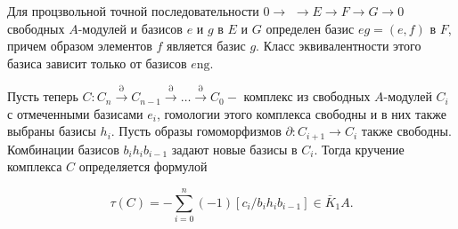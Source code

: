 \documentclass[10pt]{article}
\begin{document}
Для процзвольной точной последовательности $0 \rightarrow$ $\rightarrow E \rightarrow F \rightarrow G \rightarrow 0$ свободных $A$-модулей и базисов $e$ и $g$ в $E$ и $G$ определен базис $e g=(e, f)$ в $F$, причем образом элементов $f$ является базис $g$. Класс эквивалентности этого базиса зависит только от базисов $e \mathrm{ng}$.



Пусть теперь $C: C_{n} \stackrel{\partial}{\rightarrow} C_{n-1} \stackrel{\partial}{\rightarrow} \ldots \stackrel{\partial}{\rightarrow} C_{0}-$ комплекс из свободных $A$-модулей $C_{i}$ с отмеченными базисами $e_{i}$, гомологии этого комплекса свободны и в них также выбраны базисы $h_{i}$. Пусть образы гомоморфизмов $\partial: C_{i+1} \rightarrow C_{i}$ также свободны. Комбинации базисов $b_{i} h_{i} b_{i-1}$ задают новые базисы в $C_{i}$. Тогда кручение комплекса $C$ определяется формулой



\[

\tau(C)=-\sum_{i=0}^{n}(-1)\left[c_{i} / b_{i} h_{i} b_{i-1}\right] \in \bar{K}_{1} A .

\]
\end{document}
